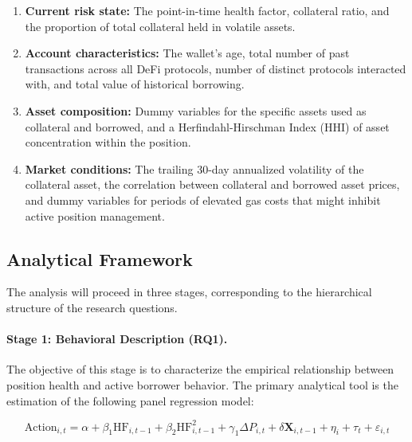 \begin{enumerate}[leftmargin=*,labelindent=\parindent, itemindent=0pt]
\item \textbf{Current risk state:} The point-in-time health factor, collateral ratio, and the proportion of total collateral held in volatile assets.
\item \textbf{Account characteristics:} The wallet's age, total number of past transactions across all DeFi protocols, number of distinct protocols interacted with, and total value of historical borrowing.
\item \textbf{Asset composition:} Dummy variables for the specific assets used as collateral and borrowed, and a Herfindahl-Hirschman Index (HHI) of asset concentration within the position.
\item \textbf{Market conditions:} The trailing 30-day annualized volatility of the collateral asset, the correlation between collateral and borrowed asset prices, and dummy variables for periods of elevated gas costs that might inhibit active position management.
\end{enumerate}

\subsection{Analytical Framework}

The analysis will proceed in three stages, corresponding to the hierarchical structure of the research questions.


\vspace{4pt}

\paragraph{Stage 1: Behavioral Description (RQ1).} The objective of this stage is to characterize the empirical relationship between position health and active borrower behavior. The primary analytical tool is the estimation of the following panel regression model:

\begin{equation}
\text{Action}_{i,t} = \alpha + \beta_1 \text{HF}_{i,t-1} + \beta_2 \text{HF}_{i,t-1}^2 + \gamma_1 \Delta P_{i,t} + \delta \mathbf{X}_{i,t-1} + \eta_i + \tau_t + \varepsilon_{i,t}
\end{equation}

